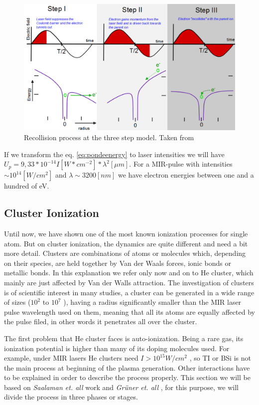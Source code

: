 \begin{figure}[hbtp]
\centering
\includegraphics[width=12 cm]{../Images/ponderomotive steps.png}
\caption[Ponderomotive 3 steps]{Recollision  process at the three step model. Taken from \cite{krishnan_doped_2011}}
\label{fig:ponder}
\end{figure}


If we transform the eq. \ref{eq:pondeenergy} to laser intensities we will have $U_{p} = 9,33*10^{-14}I[W*cm^{-2}] * \lambda^{2}[\mu m]$. For a MIR-pulse with intensities $\sim 10^{14} [W/cm^{2}]$ and $\lambda \sim 3200 [nm]$ we have electron energies between one and a hundred of eV.

\subsection{Cluster Ionization}

Until now, we have shown one of the most known ionization processes for single atom. But on cluster ionization, the dynamics are quite different and need a bit more detail. Clusters are combinations of atoms or molecules which, depending on their species, are held together by Van der Waals forces, ionic bonds or metallic bonds. In this explanation we refer only now and on to He cluster, which mainly are just affected by Van der Walls attraction. The investigation of clusters is of scientific interest in many studies, a cluster can be generated in a wide range of sizes ($10^{2}$ to $10^{7}$ )\cite{stienkemeier_spectroscopy_2006}, having a radius significantly smaller than the MIR laser pulse wavelength used on them, meaning that all its atoms are equally affected by the pulse filed, in other words it penetrates all over the cluster.

The first problem that He cluster faces is auto-ionization. Being a rare gas, its ionization potential is higher than many of its doping molecules used. For example, under MIR lasers He clusters need $I > 10^{15} W/cm^{2}$ , so TI or BSi is not the main process at beginning of the plasma generation. Other interactions have to be explained in order to describe the process properly. This section we will be based on \textit{Saalaman et. all} work \cite{saalmann_mechanisms_2006} and \textit{Grüner et. all} \cite{gruner_femtosekundenspektroskopie_2013}, for this purpose, we will divide the process in three phases or stages.


